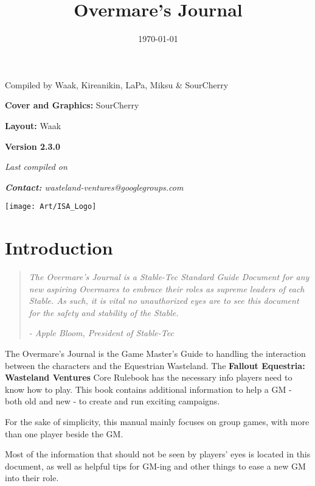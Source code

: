 \documentclass[11pt,a4paper,twocolumn]{book}
\title{Overmare's Journal}
\date{\today}
\begin{document}
	
		
	\onecolumn	
	\setcounter{page}{1}
	\begin{center}
		Compiled by Waak, Kireanikin, LaPa, Miksu \& SourCherry
		
		\bigskip
		\textbf{Cover and Graphics:} SourCherry
		
		\bigskip
		\textbf{Layout:} Waak

	\end{center}
	
	\vfill
	
	\begin{center}
		\textbf{Version 2.3.0}
		
		\emph{Last compiled on \thedate}
        
        \emph{\textbf{Contact:} wasteland-ventures@googlegroups.com}
	\end{center}	

	\begin{figure*}[bp]
		\centering
		\texttt{[image: Art/ISA\_Logo]}
		\label{fig:isalogo}
	\end{figure*}

	\twocolumn
	\tableofcontents
	\chapter{Introduction}
    
    \begin{quote}
    \emph{The Overmare's Journal is a Stable-Tec Standard Guide Document for any new aspiring Overmares to embrace their roles as supreme leaders of each Stable. As such, it is vital no unauthorized eyes are to see this document for the safety and stability of the Stable.}
    
    \emph{- Apple Bloom, President of Stable-Tec}
    \end{quote}
     
    The Overmare's Journal is the Game Master's Guide to handling the interaction between the characters and the Equestrian Wasteland. The \textbf{Fallout Equestria: Wasteland Ventures} Core Rulebook has the necessary info players need to know how to play. This book contains additional information to help a GM - both old and new - to create and run exciting campaigns.
    
    For the sake of simplicity, this manual mainly focuses on group games, with more than one player beside the GM.
    
    Most of the information that should not be seen by players' eyes is located in this document, as well as helpful tips for GM-ing and other things to ease a new GM into their role.
    
\end{document}
